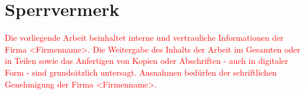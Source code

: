 \section*{Sperrvermerk}
\textcolor{red}{
Die vorliegende Arbeit beinhaltet interne und vertrauliche Informationen der Firma <Firmenname>.
Die Weitergabe des Inhalts der Arbeit im Gesamten oder in Teilen sowie das Anfertigen
von Kopien oder Abschriften - auch in digitaler Form - sind grundsätzlich untersagt.
Ausnahmen bedürfen der schriftlichen Genehmigung der Firma <Firmenname>.
}
